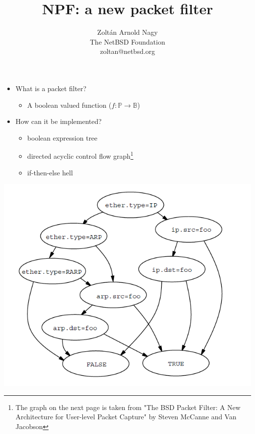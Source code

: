 \documentclass[magyar]{beamer}
\date{}
\begin{document}
\title{NPF: a new packet filter}
\author{Zoltán Arnold Nagy \\ The NetBSD Foundation \\ zoltan@netbsd.org}
\maketitle

\begin{frame}
\begin{itemize}
	\item What is a packet filter?
\pause
	\begin{itemize}
		\item A boolean valued function ($f:\mathbb{P} \rightarrow \mathbb{B}$)
	\end{itemize}
\pause
	\item How can it be implemented?
\pause
	\begin{itemize}
		\item boolean expression tree
		\item directed acyclic control flow graph\footnote{The graph on the next page is taken from "The BSD Packet Filter: A New
Architecture for User-level Packet Capture" by Steven McCanne and Van Jacobson}
		\item if-then-else hell
	\end{itemize}
\end{itemize}
\end{frame}

\begin{frame}
\begin{center}
	\includegraphics[scale=.5]{cfg}
\end{center}
\end{frame}
\end{document}
